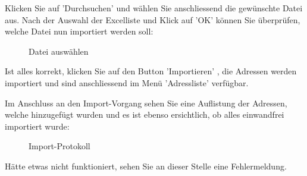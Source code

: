 \vspace{\baselineskip}

Klicken Sie auf 'Durchsuchen'  und wählen Sie anschliessend die gewünschte Datei aus. Nach der Auswahl der Excelliste und Klick auf 'OK' können Sie überprüfen, welche Datei nun importiert werden soll:

\begin{figure}[H]
\caption{Datei auswählen}
\end{figure}

Ist alles korrekt, klicken Sie auf den Button 'Importieren' , die Adressen werden importiert und sind anschliessend im Menü 'Adressliste' verfügbar. 

\vspace{\baselineskip}

Im Anschluss an den Import-Vorgang sehen Sie eine Auflistung der Adressen, welche hinzugefügt wurden und es ist ebenso ersichtlich, ob alles einwandfrei importiert wurde:

\begin{figure}[H]
\caption{Import-Protokoll}
\end{figure}

Hätte etwas nicht funktioniert, sehen Sie an dieser Stelle eine Fehlermeldung.